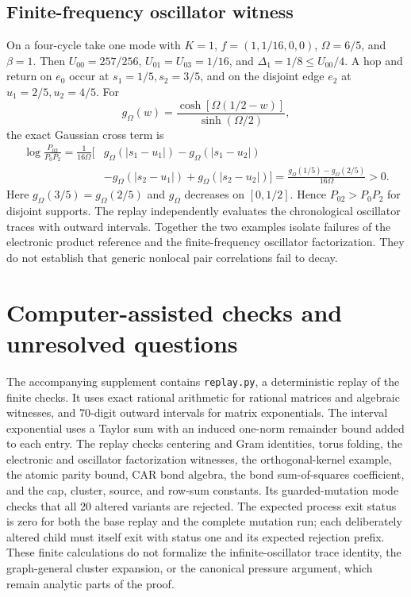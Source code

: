 \documentclass[11pt]{article}
\begin{document}
\subsection{Finite-frequency oscillator witness}
On a four-cycle take one mode with $K=1$, $f=(1,1/16,0,0)$, $\Omega=6/5$, and $\beta=1$. Then $U_{00}=257/256$, $U_{01}=U_{03}=1/16$, and $\Delta_1=1/8\le U_{00}/4$. A hop and return on $e_0$ occur at $s_1=1/5,s_2=3/5$, and on the disjoint edge $e_2$ at $u_1=2/5,u_2=4/5$. For
\[
 g_\Omega(w)=\frac{\cosh[\Omega(1/2-w)]}{\sinh(\Omega/2)},
\]
the exact Gaussian cross term is
\begin{align*}
\log\frac{P_{02}}{P_0P_2}=\frac{1}{16\Omega}\bigl[&g_\Omega(|s_1-u_1|)-g_\Omega(|s_1-u_2|)\\
&-g_\Omega(|s_2-u_1|)+g_\Omega(|s_2-u_2|)\bigr]
=\frac{g_\Omega(1/5)-g_\Omega(2/5)}{16\Omega}>0.
\end{align*}
Here $g_\Omega(3/5)=g_\Omega(2/5)$ and $g_\Omega$ decreases on $[0,1/2]$. Hence $P_{02}>P_0P_2$ for disjoint supports. The replay independently evaluates the chronological oscillator traces with outward intervals. Together the two examples isolate failures of the electronic product reference and the finite-frequency oscillator factorization. They do not establish that generic nonlocal pair correlations fail to decay.

\section{Computer-assisted checks and unresolved questions}
The accompanying supplement contains \texttt{replay.py}, a deterministic replay of the finite checks. It uses exact rational arithmetic for rational matrices and algebraic witnesses, and 70-digit outward intervals for matrix exponentials. The interval exponential uses a Taylor sum with an induced one-norm remainder bound added to each entry. The replay checks centering and Gram identities, torus folding, the electronic and oscillator factorization witnesses, the orthogonal-kernel example, the atomic parity bound, CAR bond algebra, the bond sum-of-squares coefficient, and the cap, cluster, source, and row-sum constants. Its guarded-mutation mode checks that all 20 altered variants are rejected. The expected process exit status is zero for both the base replay and the complete mutation run; each deliberately altered child must itself exit with status one and its expected rejection prefix. These finite calculations do not formalize the infinite-oscillator trace identity, the graph-general cluster expansion, or the canonical pressure argument, which remain analytic parts of the proof.
\end{document}
